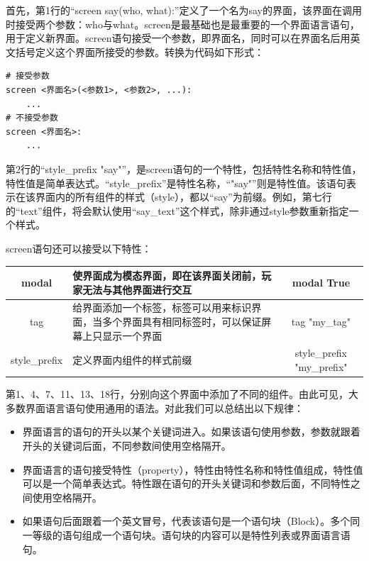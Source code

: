 \documentclass[../../Main.tex]{subfiles}
\begin{document}
首先，第1行的“screen say(who, what):”定义了一个名为say的界面，该界面在调用时接受两个参数：who与what。screen是最基础也是最重要的一个界面语言语句，用于定义新界面。screen语句接受一个参数，即界面名，同时可以在界面名后用英文括号定义这个界面所接受的参数。转换为代码如下形式：
\begin{lstlisting}
# 接受参数
screen <界面名>(<参数1>, <参数2>, ...):
    ...
# 不接受参数
screen <界面名>:
    ...
\end{lstlisting}

第2行的“style\_prefix "say"”，是screen语句的一个特性，包括特性名称和特性值，特性值是简单表达式。“style\_prefix”是特性名称，“"say"”则是特性值。该语句表示在该界面内的所有组件的样式（style），都以“say”为前缀。例如，第七行的“text”组件，将会默认使用“say\_text”这个样式，除非通过style参数重新指定一个样式。

screen语句还可以接受以下特性：
\begin{center}
    \tabletail{\hline}
    \tablelasttail{\hline}
    \begin{supertabular}{|c|p{8cm}|c|}
        \hline
        modal & 使界面成为模态界面，即在该界面关闭前，玩家无法与其他界面进行交互 & modal True\\
        \hline
        tag & 给界面添加一个标签，标签可以用来标识界面，当多个界面具有相同标签时，可以保证屏幕上只显示一个界面 & tag "my\_tag"\\
        \hline
        style\_prefix & 定义界面内组件的样式前缀 & style\_prefix "my\_prefix"\\
        \hline
    \end{supertabular}
\end{center}


第1、4、7、11、13、18行，分别向这个界面中添加了不同的组件。由此可见，大多数界面语言语句使用通用的语法。对此我们可以总结出以下规律：
\begin{itemize}
    \item 界面语言的语句的开头以某个关键词进入。如果该语句使用参数，参数就跟着开头的关键词后面，不同参数间使用空格隔开。
    \item 界面语言的语句接受特性（property），特性由特性名称和特性值组成，特性值可以是一个简单表达式。特性跟在语句的开头关键词和参数后面，不同特性之间使用空格隔开。
    \item 如果语句后面跟着一个英文冒号，代表该语句是一个语句块（Block）。多个同一等级的语句组成一个语句块。语句块的内容可以是特性列表或界面语言语句。
\end{itemize}
\end{document}
